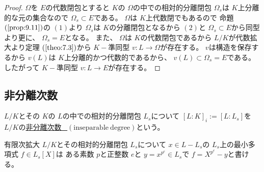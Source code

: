 \documentclass[../master_galois_theory]{subfiles}
\begin{document}
\begin{proof}
  $\Omega$を $E$の代数閉包とすると
  $K$の $\Omega$の中での相対的分離閉包 $\Omega_s$は
  $K$上分離的な元の集合なので $\Omega_s \subset E$である。
  $\Omega$は $K$上代数閉でもあるので
  命題 $(\mathrm{\ref{prop:9.11}})$の $(1)$より
  $\Omega_s$は $K$の分離閉包となるから $(2)$と
  $\Omega_s \subset E$から同型より更に、
  $\Omega_s = E$となる。
  また、 $\Omega$は $K$の代数閉包であるから
  $L/K$が代数拡大より定理 $(\mathrm{\ref{theo:7.3}})$から
  $K-$準同型 $v:L \longrightarrow \Omega$が存在する。
  $v$は構造を保存するから $v(L)$は $K$上分離的かつ代数的であるから、
  $v(L) \subset \Omega_s = E$である。
  したがって $K-$準同型 $v:L \longrightarrow E$が存在する。
\end{proof}

\subsection{非分離次数}

\begin{defi}
  $L/K$とその $K$の $L$の中での相対的分離閉包 $L_s$について
  $[L:K]_i := [L:L_s]$を $L/K$の\underline{非分離次数 \  $(\mathrm{inseparable \  degree})$}という。
\end{defi}

\begin{lemm} \label{lemm:bunriminimalpolynomial}
  有限次拡大 $L/K$とその相対的分離閉包 $L_s$について
  $x \in L - L_s$の $L_s$上の最小多項式 $f \in L_s[X]$は
  ある素数 $p$と正整数 $e$と $y = x^{p^e} \in L_s$で
  $f = X^{p^e} - y$と書ける。
\end{lemm}
\end{document}
